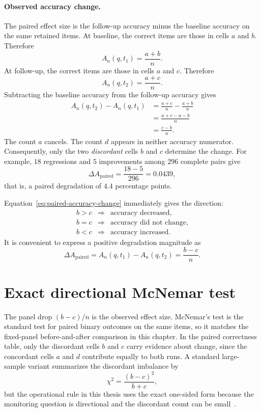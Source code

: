 \paragraph{Observed accuracy change.}

The paired effect size is the follow-up accuracy minus the baseline accuracy on the same retained items. At baseline, the correct items are those in cells \(a\) and \(b\). Therefore
\[
A_n(q,t_1)=\frac{a+b}{n}.
\]
At follow-up, the correct items are those in cells \(a\) and \(c\). Therefore
\[
A_n(q,t_2)=\frac{a+c}{n}.
\]
Subtracting the baseline accuracy from the follow-up accuracy gives
\begin{align}
A_n(q,t_2)-A_n(q,t_1)
&=\frac{a+c}{n}-\frac{a+b}{n}\\
&=\frac{a+c-a-b}{n}\\
&=\frac{c-b}{n}.
\label{eq:paired-accuracy-change}
\end{align}
The count \(a\) cancels. The count \(d\) appears in neither accuracy numerator. Consequently, only the two \emph{discordant} cells \(b\) and \(c\) determine the change. For example, \(18\) regressions and \(5\) improvements among \(296\) complete pairs give
\[
\Delta A_{\mathrm{paired}}=\frac{18-5}{296}=0.0439,
\]
that is, a paired degradation of \(4.4\) percentage points.

Equation~\eqref{eq:paired-accuracy-change} immediately gives the direction:
\[
\begin{array}{lll}
b>c &\Longrightarrow& \text{accuracy decreased},\\
b=c &\Longrightarrow& \text{accuracy did not change},\\
b<c &\Longrightarrow& \text{accuracy increased}.
\end{array}
\]
It is convenient to express a positive degradation magnitude as
\begin{equation}
    \Delta A_{\mathrm{paired}}
    =
    A_n(q,t_1)-A_n(q,t_2)
    =
    \frac{b-c}{n}.
    \label{eq:observed-drop}
\end{equation}

\section{Exact directional McNemar test}
\label{sec:mcnemar-section}

The panel drop \((b-c)/n\) is the observed effect size. McNemar's test is the standard test for paired binary outcomes on the same items, so it matches the fixed-panel before-and-after comparison in this chapter. In the paired correctness table, only the discordant cells \(b\) and \(c\) carry evidence about change, since the concordant cells \(a\) and \(d\) contribute equally to both runs. A standard large-sample variant summarizes the discordant imbalance by
\[
\chi^2=\frac{(b-c)^2}{b+c},
\]
but the operational rule in this thesis uses the exact one-sided form because the monitoring question is directional and the discordant count can be small~\cite{mcnemar1947}.

